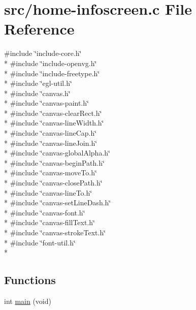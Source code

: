 \hypertarget{home-infoscreen_8c}{}\section{src/home-\/infoscreen.c File Reference}
\label{home-infoscreen_8c}
{\ttfamily \#include \char`\"{}include-\/core.\+h\char`\"{}}\\*
{\ttfamily \#include \char`\"{}include-\/openvg.\+h\char`\"{}}\\*
{\ttfamily \#include \char`\"{}include-\/freetype.\+h\char`\"{}}\\*
{\ttfamily \#include \char`\"{}egl-\/util.\+h\char`\"{}}\\*
{\ttfamily \#include \char`\"{}canvas.\+h\char`\"{}}\\*
{\ttfamily \#include \char`\"{}canvas-\/paint.\+h\char`\"{}}\\*
{\ttfamily \#include \char`\"{}canvas-\/clear\+Rect.\+h\char`\"{}}\\*
{\ttfamily \#include \char`\"{}canvas-\/line\+Width.\+h\char`\"{}}\\*
{\ttfamily \#include \char`\"{}canvas-\/line\+Cap.\+h\char`\"{}}\\*
{\ttfamily \#include \char`\"{}canvas-\/line\+Join.\+h\char`\"{}}\\*
{\ttfamily \#include \char`\"{}canvas-\/global\+Alpha.\+h\char`\"{}}\\*
{\ttfamily \#include \char`\"{}canvas-\/begin\+Path.\+h\char`\"{}}\\*
{\ttfamily \#include \char`\"{}canvas-\/move\+To.\+h\char`\"{}}\\*
{\ttfamily \#include \char`\"{}canvas-\/close\+Path.\+h\char`\"{}}\\*
{\ttfamily \#include \char`\"{}canvas-\/line\+To.\+h\char`\"{}}\\*
{\ttfamily \#include \char`\"{}canvas-\/set\+Line\+Dash.\+h\char`\"{}}\\*
{\ttfamily \#include \char`\"{}canvas-\/font.\+h\char`\"{}}\\*
{\ttfamily \#include \char`\"{}canvas-\/fill\+Text.\+h\char`\"{}}\\*
{\ttfamily \#include \char`\"{}canvas-\/stroke\+Text.\+h\char`\"{}}\\*
{\ttfamily \#include \char`\"{}font-\/util.\+h\char`\"{}}\\*
\subsection*{Functions}
\begin{DoxyCompactItemize}
\item 
int \hyperlink{home-infoscreen_8c_a840291bc02cba5474a4cb46a9b9566fe}{main} (void)
\end{DoxyCompactItemize}


